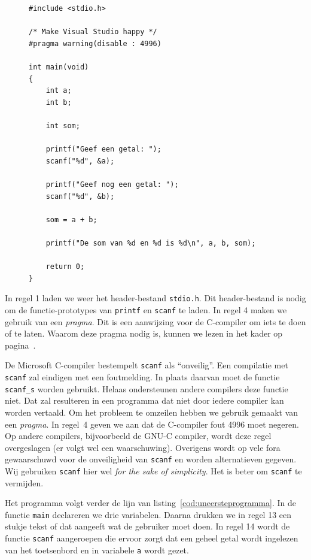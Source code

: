 \begin{figure}[!ht]
\begin{lstlisting}[caption=Invoer van de gebruiker opvragen.,label=cod:unscanfprogramma]
#include <stdio.h>

/* Make Visual Studio happy */
#pragma warning(disable : 4996)

int main(void) 
{
    int a;
    int b;

    int som;

    printf("Geef een getal: ");
    scanf("%d", &a);

    printf("Geef nog een getal: ");
    scanf("%d", &b);

    som = a + b;

    printf("De som van %d en %d is %d\n", a, b, som);

    return 0;
}
\end{lstlisting}
\end{figure}

In regel 1 laden we weer het header-bestand \texttt{stdio.h}. Dit header-bestand is nodig om de functie-prototypes van \texttt{printf} en \texttt{scanf} te laden. In regel 4 maken we gebruik van een \textsl{pragma}. Dit is een aanwijzing voor de C-compiler om iets te doen of te laten. Waarom deze pragma nodig is, kunnen we lezen in het kader op pagina~\pageref{fig:unopmerkingscanf}.

\begin{infobox}
\label{fig:unopmerkingscanf}%
De Microsoft C-compiler bestempelt \texttt{scanf} als ``onveilig''. Een compilatie met \texttt{scanf} zal eindigen met een foutmelding. In plaats daarvan moet de functie \texttt{scanf\_s} worden gebruikt. Helaas ondersteunen andere compilers deze functie niet. Dat zal resulteren in een programma dat niet door iedere compiler kan worden vertaald. Om het probleem te omzeilen hebben we gebruik gemaakt van een \textsl{pragma}. In regel~4 geven we aan dat de C-compiler fout 4996 moet negeren. Op andere compilers, bijvoorbeeld de GNU-C compiler, wordt deze regel overgeslagen (er volgt wel een waarschuwing). Overigens wordt op vele fora gewaarschuwd voor de onveiligheid van \texttt{scanf} en worden alternatieven gegeven. Wij gebruiken \texttt{scanf} hier wel \textsl{for the sake of simplicity}. Het is beter om \texttt{scanf} te vermijden.
\end{infobox}

Het programma volgt verder de lijn van listing~\ref{cod:uneersteprogramma}. In de functie \texttt{main} declareren we drie variabelen. Daarna drukken we in regel 13 een stukje tekst of dat aangeeft wat de gebruiker moet doen. In regel 14 wordt de functie \texttt{scanf} aangeroepen die ervoor zorgt dat een geheel getal wordt ingelezen van het toetsenbord en in variabele \texttt{a} wordt gezet.

